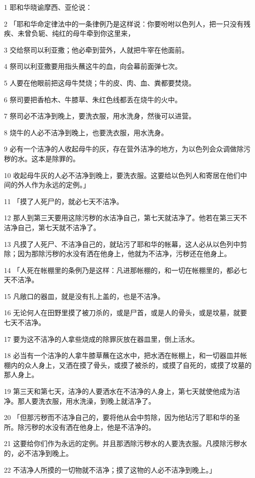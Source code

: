 \par 1 耶和华晓谕摩西、亚伦说：
\par 2 「耶和华命定律法中的一条律例乃是这样说：你要吩咐以色列人，把一只没有残疾、未曾负轭、纯红的母牛牵到你这里来，
\par 3 交给祭司以利亚撒；他必牵到营外，人就把牛宰在他面前。
\par 4 祭司以利亚撒要用指头蘸这牛的血，向会幕前面弹七次。
\par 5 人要在他眼前把这母牛焚烧；牛的皮、肉、血、粪都要焚烧。
\par 6 祭司要把香柏木、牛膝草、朱红色线都丢在烧牛的火中。
\par 7 祭司必不洁净到晚上，要洗衣服，用水洗身，然後可以进营。
\par 8 烧牛的人必不洁净到晚上，也要洗衣服，用水洗身。
\par 9 必有一个洁净的人收起母牛的灰，存在营外洁净的地方，为以色列会众调做除污秽的水。这本是除罪的。
\par 10 收起母牛灰的人必不洁净到晚上，要洗衣服。这要给以色列人和寄居在他们中间的外人作为永远的定例。」
\par 11 「摸了人死尸的，就必七天不洁净。
\par 12 那人到第三天要用这除污秽的水洁净自己，第七天就洁净了。他若在第三天不洁净自己，第七天就不洁净了。
\par 13 凡摸了人死尸、不洁净自己的，就玷污了耶和华的帐幕，这人必从以色列中剪除；因为那除污秽的水没有洒在他身上，他就为不洁净，污秽还在他身上。
\par 14 「人死在帐棚里的条例乃是这样：凡进那帐棚的，和一切在帐棚里的，都必七天不洁净。
\par 15 凡敞口的器皿，就是没有扎上盖的，也是不洁净。
\par 16 无论何人在田野里摸了被刀杀的，或是尸首，或是人的骨头，或是坟墓，就要七天不洁净。
\par 17 要为这不洁净的人拿些烧成的除罪灰放在器皿里，倒上活水。
\par 18 必当有一个洁净的人拿牛膝草蘸在这水中，把水洒在帐棚上，和一切器皿并帐棚内的众人身上，又洒在摸了骨头，或摸了被杀的，或摸了自死的，或摸了坟墓的那人身上。
\par 19 第三天和第七天，洁净的人要洒水在不洁净的人身上，第七天就使他成为洁净。那人要洗衣服，用水洗澡，到晚上就洁净了。
\par 20 「但那污秽而不洁净自己的，要将他从会中剪除，因为他玷污了耶和华的圣所。除污秽的水没有洒在他身上，他是不洁净的。
\par 21 这要给你们作为永远的定例。并且那洒除污秽水的人要洗衣服。凡摸除污秽水的，必不洁净到晚上。
\par 22 不洁净人所摸的一切物就不洁净；摸了这物的人必不洁净到晚上。」

